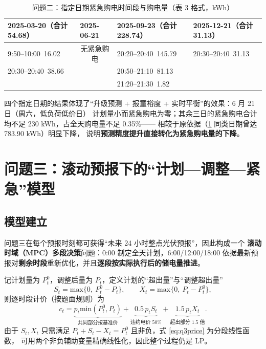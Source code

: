 \documentclass[12pt,a4paper,fontset=fandol]{ctexart}
\begin{document}
\begin{table}[htbp]
\centering
\caption{问题二\nobreak：指定日期紧急购电时间段与购电量（表 3 格式\nobreak，kWh\nobreak）}
\label{tab:q2t3}
\begin{tabular}{@{}llll@{}}
\toprule
2025-03-20（合计 54.68\nobreak） & 2025-06-21 & 2025-09-23（合计 228.74\nobreak） & 2025-12-21（合计 31.13\nobreak） \\
\midrule
9:50--10:00\ 16.02 & \multicolumn{1}{c}{无紧急购电} & 20:20--20:40\ 145.79 & 20:30--20:40\ 31.13 \\
20:30--20:40\ 38.66 & & 20:50--21:10\ 81.13 & \\
 & & 21:20--21:30\ 1.82 & \\
\bottomrule
\end{tabular}
\end{table}

四个指定日期的结果体现了“升级预测 + 报童裕度 + 实时平衡\nobreak”的效果\nobreak：6 月 21 日（周六\nobreak，低负荷低价日\nobreak）
计划量小而紧急购电为零\nobreak；其余三日的紧急购电合计均不足 230 kWh\nobreak，占全天购电量不足 0.35\%——
相较于原依据（\cref{tab:q2t3} 同类日期曾达 783.90 kWh\nobreak）明显下降\nobreak，
说明\textbf{预测精度提升直接转化为紧急购电量的下降}\nobreak。


\section{问题三\nobreak：滚动预报下的“计划—调整—紧急\nobreak”模型}
\label{sec:q3}

\subsection{模型建立}

问题三在每个预报时刻都可获得“未来 24 小时整点光伏预报\nobreak”\nobreak，因此构成一个
\textbf{滚动时域（MPC\nobreak）多段决策}问题\nobreak：0:00 制定全天计划\nobreak，6:00/12:00/18:00
依据最新预报对\textbf{剩余时段}重新优化\nobreak，并且\textbf{逐段按实际执行后的储电量推进}\nobreak。

记计划量为 $P^0_t$\nobreak，调整后量为 $P_t$\nobreak，定义计划的“超出量\nobreak”与“调整超出量\nobreak”
\begin{equation}
S_t=\text{max}\{0,\ P^0_t-P_t\},\qquad X_t=\text{max}\{0,\ P_t-P^0_t\},
\label{eq:SX}
\end{equation}
则逐时段计价（按题面规则\nobreak）为
\begin{equation}
c_t=\underbrace{p_t\text{min}(P^0_t,P_t)}_{\text{共同部分按基准价}}
+\underbrace{0.5\,p_t S_t}_{\text{违约电价 50\%}}
+\underbrace{1.5\,p_t X_t}_{\text{超出部分 1.5 倍}} .
\label{eq:q3price}
\end{equation}
由于 $S_t,X_t$ 只需满足 $P_t+S_t-X_t=P^0_t$ 且非负\nobreak，式 \eqref{eq:q3price} 为分段线性函数\nobreak，
可用两个非负辅助变量精确线性化\nobreak，因此整个过程仍是 LP\nobreak。
\end{document}

